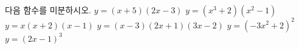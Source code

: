 다음 함수를 미분하시오.
 $y=(x+5)(2x-3)$
 $y=(x^3+2)(x^2-1)$
 $y=x(x+2)(x-1)$
 $y=(x-3)(2x+1)(3x-2)$
 $y=(-3x^2+2)^2$
 $y=(2x-1)^3$
